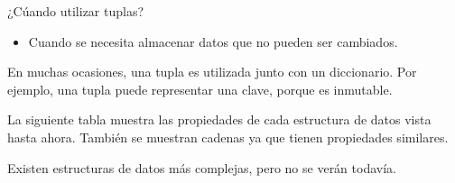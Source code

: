 ¿Cúando utilizar tuplas?

\begin{itemize}
  \item Cuando se necesita almacenar datos que no pueden ser cambiados.
\end{itemize}

En muchas ocasiones, una tupla es utilizada junto con un diccionario.
Por ejemplo, una tupla puede representar una clave, porque es inmutable.

La siguiente tabla muestra las propiedades de cada estructura de datos vista hasta ahora.
También se muestran cadenas ya que tienen propiedades similares.
\medskip\medskip


\medskip\medskip

Existen estructuras de datos más complejas, pero no se verán todavía.

\clearpage